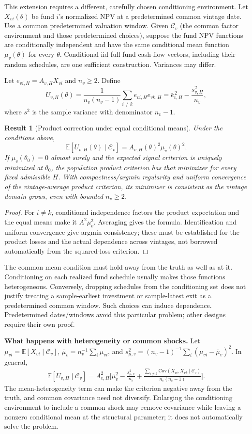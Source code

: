 \documentclass[11pt]{article}
\newcommand{\E}{\mathbb{E}}
\newcommand{\Cov}{\mathrm{Cov}}
\theoremstyle{plain}
\newtheorem{result}{Result}[section]
\theoremstyle{definition}
\begin{document}
This extension requires a different, carefully chosen conditioning environment. Let $X_{vi}(\theta)$ be fund $i$'s normalized NPV at a predetermined common vintage date. Use a common predetermined valuation window. Given $\mathcal C_v$ (the common factor environment and those predetermined choices), suppose the fund NPV functions are conditionally independent and have the same conditional mean function $\mu_v(\theta)$ for every $\theta$. Conditional iid full fund cash-flow vectors, including their random schedules, are one sufficient construction. Variances may differ.

Let $e_{vi,H}=A_{v,H}X_{vi}$ and $n_v\ge2$. Define
\[
U_{v,H}(\theta)=\frac{1}{n_v(n_v-1)}\sum_{i\ne k}e_{vi,H}e_{vk,H}
=\bar e_{v,H}^{\,2}-\frac{s_{v,H}^2}{n_v},
\]
where $s^2$ is the sample variance with denominator $n_v-1$.

\begin{result}[Product correction under equal conditional means]
\label{res:ucrit}
Under the conditions above,
\[
\E[U_{v,H}(\theta)\mid\mathcal C_v]=A_{v,H}(\theta)^2\mu_v(\theta)^2.
\]
If $\mu_v(\theta_0)=0$ almost surely and the expected signal criterion is uniquely minimized at $\theta_0$, the population product criterion has that minimizer for every fixed admissible $H$. With compactness/argmin regularity and uniform convergence of the vintage-average product criterion, its minimizer is consistent as the vintage domain grows, even with bounded $n_v\ge2$.
\end{result}
\begin{proof}
For $i\ne k$, conditional independence factors the product expectation and the equal means make it $A^2\mu_v^2$. Averaging gives the formula. Identification and uniform convergence give argmin consistency; these must be established for the product losses and the actual dependence across vintages, not borrowed automatically from the squared-loss criterion.
\end{proof}

The common mean condition must hold away from the truth as well as at it. Conditioning on each realized fund schedule usually makes those functions heterogeneous. Conversely, dropping schedules from the conditioning set does not justify treating a sample-earliest investment or sample-latest exit as a predetermined common window. Such choices can induce dependence. Predetermined dates/windows avoid this particular problem; other designs require their own proof.

\textbf{What happens with heterogeneity or common shocks.} Let $\mu_{vi}=\E[X_{vi}\mid\mathcal C_v]$, $\bar\mu_v=n_v^{-1}\sum_i\mu_{vi}$, and $s_{\mu,v}^2=(n_v-1)^{-1}\sum_i(\mu_{vi}-\bar\mu_v)^2$. In general,
\begin{align*}
\E[U_{v,H}\mid\mathcal C_v]=A_{v,H}^2\bigg[\bar\mu_v^2-\frac{s_{\mu,v}^2}{n_v}
+\frac{\sum_{i\ne k}\Cov(X_{vi},X_{vk}\mid\mathcal C_v)}{n_v(n_v-1)}\bigg].
\end{align*}
The mean-heterogeneity term can make the criterion negative away from the truth, and common covariance need not diversify. Enlarging the conditioning environment to include a common shock may remove covariance while leaving a nonzero conditional mean at the structural parameter; it does not automatically solve the problem.
\end{document}
